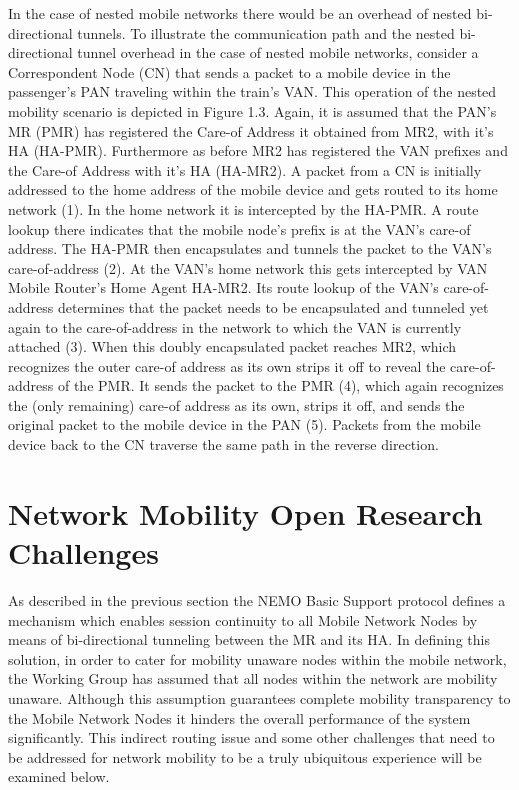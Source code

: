 In the case of nested mobile networks there would be an overhead of nested
bi-directional tunnels. To illustrate the communication path and the nested
bi-directional tunnel overhead in the case of nested mobile networks, consider
a Correspondent Node (CN) that sends a packet to a mobile device in the
passenger's PAN traveling within the train's VAN. This operation of the nested
mobility scenario is depicted in Figure 1.3. Again, it is assumed that the PAN's
MR (PMR) has registered the Care-of Address it obtained from MR2, with it's HA
(HA-PMR). Furthermore as before MR2 has registered the VAN prefixes and the
Care-of Address with it's HA (HA-MR2). A packet from a CN is initially
addressed to the home address of the mobile device and gets routed to its home
network (1). In the home network it is intercepted by the HA-PMR. A route
lookup there indicates that the mobile node's prefix is at the VAN's care-of
address. The HA-PMR then encapsulates and tunnels the packet to the VAN's
care-of-address (2). At the VAN's home network this gets intercepted by VAN
Mobile Router's Home Agent HA-MR2. Its route lookup of the VAN's
care-of-address determines that the packet needs to be encapsulated and
tunneled yet again to the care-of-address in the network to which the VAN is
currently attached (3). When this doubly encapsulated packet reaches MR2,
which recognizes the outer care-of address as its own strips it off to reveal
the care-of-address of the PMR. It sends the packet to the PMR (4), which
again recognizes the (only remaining) care-of address as its own, strips it
off, and sends the original packet to the mobile device in the PAN (5).
Packets from the mobile device back to the CN traverse the same path in the
reverse direction.

\section{Network Mobility Open Research Challenges}

As described in the previous section the NEMO Basic Support protocol defines
a mechanism which enables session continuity to all Mobile Network Nodes by means of bi-directional tunneling between the MR and its HA. In defining this solution, in order to cater for mobility unaware nodes within the mobile network, the Working Group has
assumed that all nodes within the network are mobility unaware. Although this assumption guarantees complete mobility transparency to the Mobile Network Nodes it hinders the overall performance of the system significantly. This indirect routing issue and some other challenges that need to be addressed for network mobility to be a truly ubiquitous experience will be examined below.

